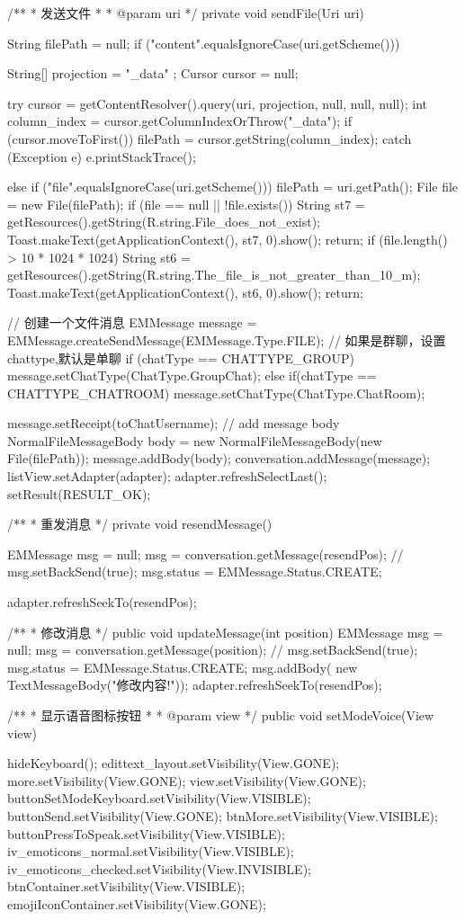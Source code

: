 {{	}

	/**
	 * 发送文件
	 * 
	 * @param uri
	 */
	private void sendFile(Uri uri) {
		String filePath = null;
		if ("content".equalsIgnoreCase(uri.getScheme())) {
			String[] projection = { "_data" };
			Cursor cursor = null;

			try {
				cursor = getContentResolver().query(uri, projection, null, null, null);
				int column_index = cursor.getColumnIndexOrThrow("_data");
				if (cursor.moveToFirst()) {
					filePath = cursor.getString(column_index);
				}
			} catch (Exception e) {
				e.printStackTrace();
			}
		} else if ("file".equalsIgnoreCase(uri.getScheme())) {
			filePath = uri.getPath();
		}
		File file = new File(filePath);
		if (file == null || !file.exists()) {
			String st7 = getResources().getString(R.string.File_does_not_exist);
			Toast.makeText(getApplicationContext(), st7, 0).show();
			return;
		}
		if (file.length() > 10 * 1024 * 1024) {
			String st6 = getResources().getString(R.string.The_file_is_not_greater_than_10_m);
			Toast.makeText(getApplicationContext(), st6, 0).show();
			return;
		}

		// 创建一个文件消息
		EMMessage message = EMMessage.createSendMessage(EMMessage.Type.FILE);
		// 如果是群聊，设置chattype,默认是单聊
		if (chatType == CHATTYPE_GROUP){
			message.setChatType(ChatType.GroupChat);
		}else if(chatType == CHATTYPE_CHATROOM){
		    message.setChatType(ChatType.ChatRoom);
		}

		message.setReceipt(toChatUsername);
		// add message body
		NormalFileMessageBody body = new NormalFileMessageBody(new File(filePath));
		message.addBody(body);
		conversation.addMessage(message);
		listView.setAdapter(adapter);
		adapter.refreshSelectLast();
		setResult(RESULT_OK);
	}

	/**
	 * 重发消息
	 */
	private void resendMessage() {
		EMMessage msg = null;
		msg = conversation.getMessage(resendPos);
		// msg.setBackSend(true);
		msg.status = EMMessage.Status.CREATE;

		adapter.refreshSeekTo(resendPos);
	}

    /**
     * 修改消息
     */
    public void updateMessage(int position) {
        EMMessage msg = null;
        msg = conversation.getMessage(position);
        // msg.setBackSend(true);
        msg.status = EMMessage.Status.CREATE;
        msg.addBody( new TextMessageBody("修改内容!"));
        adapter.refreshSeekTo(resendPos);
    }

	/**
	 * 显示语音图标按钮
	 * 
	 * @param view
	 */
	public void setModeVoice(View view) {
		hideKeyboard();
		edittext_layout.setVisibility(View.GONE);
		more.setVisibility(View.GONE);
		view.setVisibility(View.GONE);
		buttonSetModeKeyboard.setVisibility(View.VISIBLE);
		buttonSend.setVisibility(View.GONE);
		btnMore.setVisibility(View.VISIBLE);
		buttonPressToSpeak.setVisibility(View.VISIBLE);
		iv_emoticons_normal.setVisibility(View.VISIBLE);
		iv_emoticons_checked.setVisibility(View.INVISIBLE);
		btnContainer.setVisibility(View.VISIBLE);
		emojiIconContainer.setVisibility(View.GONE);

}}
